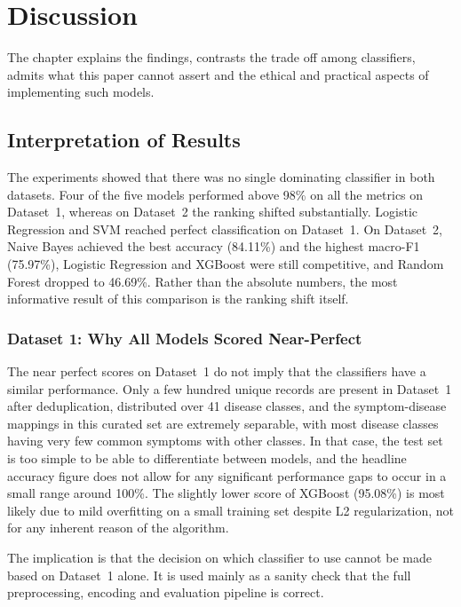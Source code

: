 \chapter{Discussion}
\label{ch:discussion}

The chapter explains the findings, contrasts the trade off among classifiers, admits what this paper cannot assert and the ethical and practical aspects of implementing such models.

\section{Interpretation of Results}
\label{sec:interpretation}

The experiments showed that there was no single dominating classifier in both datasets. Four of the five models performed above 98\% on all the metrics on Dataset~1, whereas on Dataset~2 the ranking shifted substantially. Logistic Regression and SVM reached perfect classification on Dataset~1. On Dataset~2, Naive Bayes achieved the best accuracy (84.11\%) and the highest macro-F1 (75.97\%), Logistic Regression and XGBoost were still competitive, and Random Forest dropped to 46.69\%. Rather than the absolute numbers, the most informative result of this comparison is the ranking shift itself.

\subsection{Dataset 1: Why All Models Scored Near-Perfect}

The near perfect scores on Dataset~1 do not imply that the classifiers have a similar performance. Only a few hundred unique records are present in Dataset~1 after deduplication, distributed over 41 disease classes, and the symptom-disease mappings in this curated set are extremely separable, with most disease classes having very few common symptoms with other classes. In that case, the test set is too simple to be able to differentiate between models, and the headline accuracy figure does not allow for any significant performance gaps to occur in a small range around 100\%. The slightly lower score of XGBoost (95.08\%) is most likely due to mild overfitting on a small training set despite L2 regularization, not for any inherent reason of the algorithm.

The implication is that the decision on which classifier to use cannot be made based on Dataset~1 alone. It is used mainly as a sanity check that the full preprocessing, encoding and evaluation pipeline is correct.

